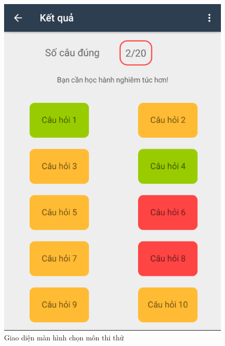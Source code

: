 \documentclass[a4paper]{article}
\begin{document}
\begin{figure}[H]
    \centering
    \includegraphics[scale=.3]{mark_ui.png}
    \caption{Giao diện màn hình chọn môn thi thử}

\end{figure}
\end{document}
